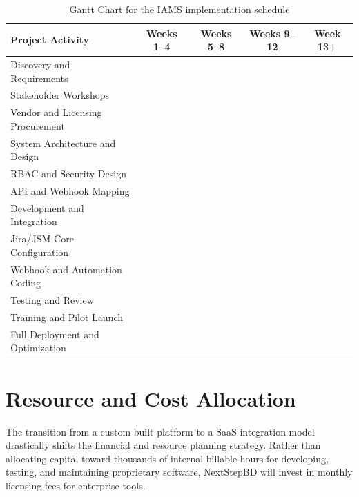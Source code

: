 \documentclass[12pt,a4paper]{report}
\begin{document}
\begin{table}[H]
\centering
\renewcommand{\arraystretch}{1.25}
\small
\begin{tabularx}{\textwidth}{|p{4.6cm}|c|c|c|c|}
\hline
\rowcolor{secondary}
\textbf{Project Activity} & \textbf{Weeks 1--4} & \textbf{Weeks 5--8} & \textbf{Weeks 9--12} & \textbf{Week 13+} \\
\hline
Discovery and Requirements & \cellcolor{accent!55} & & & \\
\hline
Stakeholder Workshops & \cellcolor{accent!35} & & & \\
\hline
Vendor and Licensing Procurement & \cellcolor{accent!35} & & & \\
\hline
System Architecture and Design & \cellcolor{primary!25} & \cellcolor{primary!45} & & \\
\hline
RBAC and Security Design & & \cellcolor{primary!35} & & \\
\hline
API and Webhook Mapping & & \cellcolor{primary!35} & & \\
\hline
Development and Integration & & \cellcolor{nextstepblue!35} & \cellcolor{nextstepblue!55} & \\
\hline
Jira/JSM Core Configuration & & \cellcolor{nextstepblue!30} & & \\
\hline
Webhook and Automation Coding & & & \cellcolor{nextstepblue!45} & \\
\hline
Testing and Review & & & \cellcolor{accent!25} & \\
\hline
Training and Pilot Launch & & & \cellcolor{accent!20} & \cellcolor{accent!40} \\
\hline
Full Deployment and Optimization & & & & \cellcolor{primary!45} \\
\hline
\end{tabularx}
\caption{Gantt Chart for the IAMS implementation schedule}
\end{table}

\section{Resource and Cost Allocation}

The transition from a custom-built platform to a SaaS integration model drastically shifts the financial and resource planning strategy. Rather than allocating capital toward thousands of internal billable hours for developing, testing, and maintaining proprietary software, NextStepBD will invest in monthly licensing fees for enterprise tools. 
\end{document}
